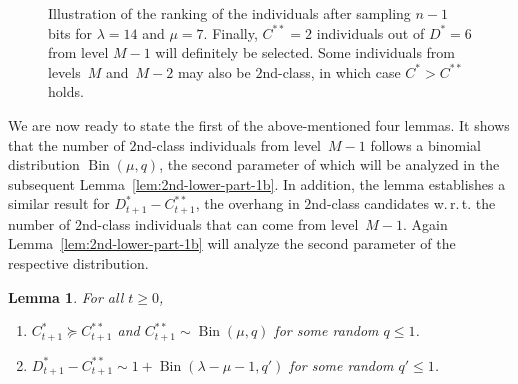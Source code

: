 \documentclass[11pt, a4paper]{article}
\newtheorem{lemma}{Lemma}
\newcommand{\umda}{UMDA\xspace}
\newcommand*{\E}{\mathrm{E}}
\newcommand{\wrt}{w.\,r.\,t.\xspace}
\DeclareMathOperator{\Bin}{Bin}
\begin{document}
\begin{figure}[htb]
\caption{Illustration of the ranking of the individuals after sampling $n-1$ bits for $\lambda=14$ and $\mu=7$. Finally,  
$C^{**}=2$ individuals out of $D^*=6$ from level $M-1$  will definitely be selected. Some  individuals from levels~$M$ and~$M-2$ 
may also be $2$nd-class, in which case $C^*  > C^{**}$ holds.}
\label{fig:first-and-second}
\end{figure}

We are now ready to state the first of the above-mentioned four lemmas. It shows that the number of $2$nd-class 
individuals from level~$M-1$ follows a binomial distribution $\Bin(\mu,q)$, the second parameter of which will be 
analyzed in the subsequent Lemma~\ref{lem:2nd-lower-part-1b}. In addition, the lemma establishes a similar 
result for $D^*_{t+1} - C^{**}_{t+1}$, the overhang in $2$nd-class candidates \wrt the number of 
$2$nd-class individuals that can come from level~$M-1$. Again Lemma~\ref{lem:2nd-lower-part-1b} will 
analyze the second parameter of the respective distribution.


\begin{lemma}
\label{lem:2nd-lower-part-1}
For all $t\ge 0$, 
\begin{enumerate}
\item $C^*_{t+1}\succeq C^{**}_{t+1}$ and $C^{**}_{t+1}\sim \Bin(\mu,q)$ for some random $q\le 1$. 
\item $D^*_{t+1} - C^{**}_{t+1}\sim 1 + \Bin(\lambda-\mu-1,q')$ for some random $q'\le 1$. 
\end{enumerate}
\end{lemma}
\end{document}
